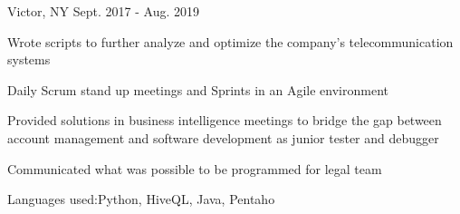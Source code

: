 \begin{cventries}
    {Victor, NY}
    {Sept. 2017 - Aug. 2019}
    {
      \begin{cvitems}
        \item {Wrote scripts to further analyze and optimize the company's telecommunication systems}
        \item {Daily Scrum stand up meetings and Sprints in an Agile environment}
        \item {Provided solutions in business intelligence meetings to bridge the gap between account management and software development as junior tester and debugger}
        \item{Communicated what was possible to be programmed for legal team}
        \item{Languages used:Python, HiveQL, Java, Pentaho}
      \end{cvitems}
    }


\end{cventries}
